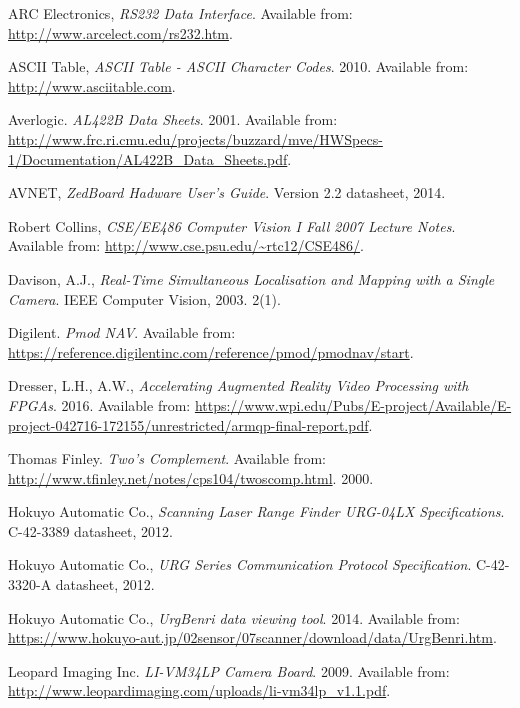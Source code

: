 \begin{thebibliography}{9}

ARC Electronics, \textit{RS232 Data Interface}. Available from: \url{http://www.arcelect.com/rs232.htm}.

ASCII Table, \textit{ASCII Table - ASCII Character Codes}. 2010. Available from: \url{http://www.asciitable.com}.

Averlogic.
\textit{AL422B Data Sheets}. 2001.
Available from: \url{http://www.frc.ri.cmu.edu/projects/buzzard/mve/HWSpecs-1/Documentation/AL422B_Data_Sheets.pdf}.

AVNET, \textit{ZedBoard Hadware User's Guide}. Version 2.2 datasheet, 2014.

Robert Collins, \textit{CSE/EE486 Computer Vision I Fall 2007 Lecture Notes}. Available from: \url{http://www.cse.psu.edu/~rtc12/CSE486/}.

Davison, A.J.,
\textit{Real-Time Simultaneous Localisation and Mapping with a Single Camera}. 
IEEE Computer Vision, 2003. 2(1).

Digilent. \textit{Pmod NAV}. Available from: \url{https://reference.digilentinc.com/reference/pmod/pmodnav/start}.

Dresser, L.H., A.W., \textit{Accelerating Augmented Reality Video Processing with FPGAs}. 2016. Available from: \url{https://www.wpi.edu/Pubs/E-project/Available/E-project-042716-172155/unrestricted/armqp-final-report.pdf}.

Thomas Finley. \textit{Two's Complement}. Available from: \url{http://www.tfinley.net/notes/cps104/twoscomp.html}. 2000.

Hokuyo Automatic Co., \textit{Scanning Laser Range Finder URG-04LX Specifications}. C-42-3389 datasheet, 2012.

Hokuyo Automatic Co., \textit{URG Series Communication Protocol Specification}. C-42-3320-A datasheet, 2012.

Hokuyo Automatic Co., \textit{UrgBenri data viewing tool}. 2014. Available from: \url{https://www.hokuyo-aut.jp/02sensor/07scanner/download/data/UrgBenri.htm}.

Leopard Imaging Inc.
\textit{LI-VM34LP Camera Board}. 2009.
Available from: \url{http://www.leopardimaging.com/uploads/li-vm34lp_v1.1.pdf}.


\end{thebibliography}
